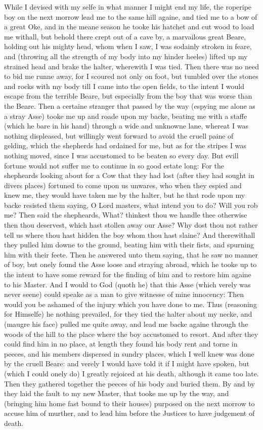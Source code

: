 While I devised with my selfe in what manner I might end my life, the roperipe
boy on the next morrow lead me to the same hill againe, and tied me to a bow of
a great Oke, and in the meane season he tooke his hatchet and cut wood to load
me withall, but behold there crept out of a cave by, a marvailous great Beare,
holding out his mighty head, whom when I saw, I was sodainly stroken in feare,
and (throwing all the strength of my body into my hinder heeles) lifted up my
strained head and brake the halter, wherewith I was tied. Then there was no
need to bid me runne away, for I scoured not only on foot, but tumbled over the
stones and rocks with my body till I came into the open fields, to the intent I
would escape from the terrible Beare, but especially from the boy that was
worse than the Beare. Then a certaine stranger that passed by the way (espying
me alone as a stray Asse) tooke me up and roade upon my backe, beating me with
a staffe (which he bare in his hand) through a wide and unknowne lane, whereat
I was nothing displeased, but willingly went forward to avoid the cruell paine
of gelding, which the shepherds had ordained for me, but as for the stripes I
was nothing moved, since I was accustomed to be beaten so every day. But evill
fortune would not suffer me to continue in so good estate long: For the
shepheards looking about for a Cow that they had lost (after they had sought in
divers places) fortuned to come upon us unwares, who when they espied and knew
me, they would have taken me by the halter, but he that rode upon my backe
resisted them saying, O Lord masters, what intend you to do? Will you rob me?
Then said the shepheards, What? thinkest thou we handle thee otherwise then
thou deservest, which hast stollen away our Asse? Why dost thou not rather tell
us where thou hast hidden the boy whom thou hast slaine? And therewithall they
pulled him downe to the ground, beating him with their fists, and spurning him
with their feete. Then he answered unto them saying, that he saw no manner of
boy, but onely found the Asse loose and straying abroad, which he tooke up to
the intent to have some reward for the finding of him and to restore him againe
to his Master. And I would to God (quoth he) that this Asse (which verely was
never seene) could speake as a man to give witnesse of mine innocency: Then
would you be ashamed of the injury which you have done to me. Thus (reasoning
for Himselfe) he nothing prevailed, for they tied the halter about my necke,
and (maugre his face) pulled me quite away, and lead me backe againe through
the woods of the hill to the place where the boy accustomed to resort. And
after they could find him in no place, at length they found his body rent and
torne in peeces, and his members dispersed in sundry places, which I well knew
was done by the cruell Beare: and verely I would have told it if I might have
spoken, but (which I could onely do) I greatly rejoiced at his death, although
it came too late. Then they gathered together the peeces of his body and buried
them. By and by they laid the fault to my new Master, that tooke me up by the
way, and (bringing him home fast bound to their houses) purposed on the next
morrow to accuse him of murther, and to lead him before the Justices to have
judgement of death.

